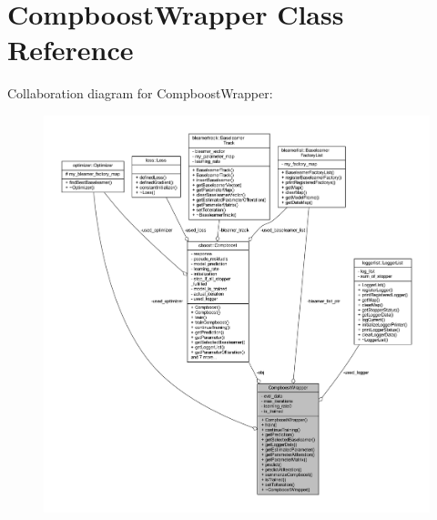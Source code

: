 \hypertarget{class_compboost_wrapper}{}\section{Compboost\+Wrapper Class Reference}
\label{class_compboost_wrapper}


Collaboration diagram for Compboost\+Wrapper\+:\nopagebreak
\begin{figure}[H]
\begin{center}
\leavevmode
\includegraphics[width=350pt]{class_compboost_wrapper__coll__graph}
\end{center}
\end{figure}
